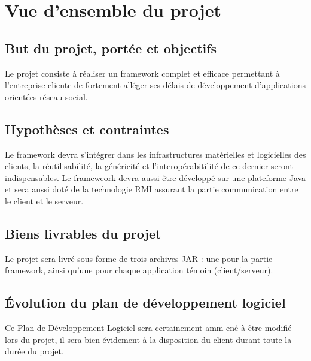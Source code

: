 
\section{Vue d’ensemble du projet}
\subsection{But du projet, portée et objectifs}
Le projet consiste à réaliser un framework complet et efficace permettant à l'entreprise cliente de fortement alléger ses délais de développement d'applications orientées réseau social.

\subsection{Hypothèses et contraintes}
Le framework devra s'intégrer dans les infrastructures matérielles et logicielles des clients, la réutilisabilité, la généricité et l'interopérabitilité de ce dernier seront indispensables.
Le frameweork devra aussi être développé sur une plateforme Java et sera aussi doté de la technologie RMI assurant la partie communication entre le client et le serveur.

\subsection{Biens livrables du projet}
Le projet sera livré sous forme de trois archives JAR : une pour la partie framework,
ainsi qu'une pour chaque application témoin (client/serveur).

\subsection{Évolution du plan de développement logiciel}
Ce Plan de Développement Logiciel sera certainement amm	ené à être modifié lors du projet, il sera bien évidement à la disposition du client durant toute la durée du projet.
